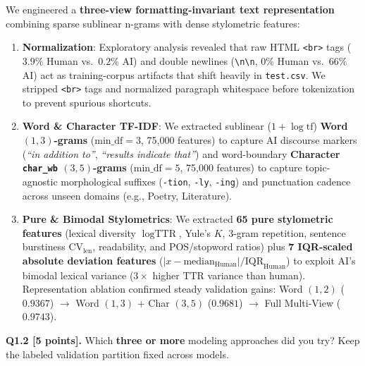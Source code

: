 \documentclass[11pt,letterpaper]{article}
\begin{document}
We engineered a \textbf{three-view formatting-invariant text representation} combining sparse sublinear n-grams with dense stylometric features:
\begin{enumerate}[leftmargin=*,itemsep=1pt,topsep=2pt]
    \item \textbf{Normalization}: Exploratory analysis revealed that raw HTML \texttt{<br>} tags ($3.9\%$ Human vs.\ $0.2\%$ AI) and double newlines (\texttt{\textbackslash n\textbackslash n}, $0\%$ Human vs.\ $66\%$ AI) act as training-corpus artifacts that shift heavily in \texttt{test.csv}. We stripped \texttt{<br>} tags and normalized paragraph whitespace before tokenization to prevent spurious shortcuts.
    \item \textbf{Word \& Character TF-IDF}: We extracted sublinear ($1+\log\text{tf}$) \textbf{Word $(1,3)$-grams} ($\text{min\_df}=3$, 75,000 features) to capture AI discourse markers (\textit{``in addition to''}, \textit{``results indicate that''}) and word-boundary \textbf{Character \texttt{char\_wb} $(3,5)$-grams} ($\text{min\_df}=5$, 75,000 features) to capture topic-agnostic morphological suffixes (\texttt{-tion}, \texttt{-ly}, \texttt{-ing}) and punctuation cadence across unseen domains (e.g., Poetry, Literature).
    \item \textbf{Pure \& Bimodal Stylometrics}: We extracted \textbf{65 pure stylometric features} (lexical diversity $\log\text{TTR}$, Yule's $K$, 3-gram repetition, sentence burstiness $\text{CV}_{\text{len}}$, readability, and POS/stopword ratios) plus \textbf{7 IQR-scaled absolute deviation features} ($|x - \text{median}_{\text{Human}}| / \text{IQR}_{\text{Human}}$) to exploit AI's bimodal lexical variance ($3\times$ higher TTR variance than human). Representation ablation confirmed steady validation gains: Word $(1,2)$ ($0.9367$) $\to$ Word $(1,3)$ + Char $(3,5)$ ($0.9681$) $\to$ Full Multi-View ($0.9743$).
\end{enumerate}

\vspace{6pt}
\textbf{Q1.2 [5 points].} Which \textbf{three or more} modeling approaches did you try? Keep the labeled validation partition fixed across models.
\end{document}
